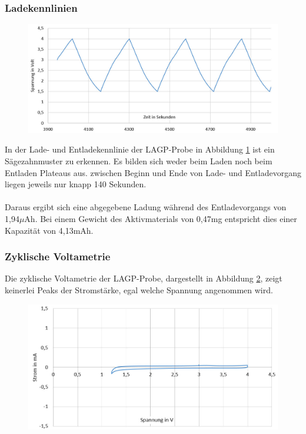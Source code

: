 \documentclass[a4paper, 11pt, headsepline,footsepline,twoside,abstract]{scrbook}
\begin{document}
\subsubsection{Ladekennlinien}
\begin{figure}
	\centering
	\includegraphics[width=1.0\columnwidth]{images/GCPL_LAGP.jpg}
	\caption{}
	\label{gcpl_LAGP}
\end{figure}
In der Lade- und Entladekennlinie der LAGP-Probe in Abbildung \ref{gcpl_LAGP} ist ein Sägezahnmuster zu erkennen. Es bilden sich weder beim Laden noch beim Entladen Plateaus aus. zwischen Beginn und Ende von Lade- und Entladevorgang liegen jeweils nur knapp 140 Sekunden.
\\\\
Daraus ergibt sich eine abgegebene Ladung während des Entladevorgangs von 1,94$\mu$Ah. Bei einem Gewicht des Aktivmaterials von 0,47mg entspricht dies einer Kapazität von 4,13mAh.
\subsubsection{Zyklische Voltametrie}
Die zyklische Voltametrie der LAGP-Probe, dargestellt in Abbildung \ref{cv_LAGP}, zeigt keinerlei Peaks der Stromstärke, egal welche Spannung angenommen wird.
\begin{figure}
	\centering
	\includegraphics[width=0.85\columnwidth]{images/CV_LAGP.jpg}
	\caption{}
	\label{cv_LAGP}
\end{figure}
\end{document}

